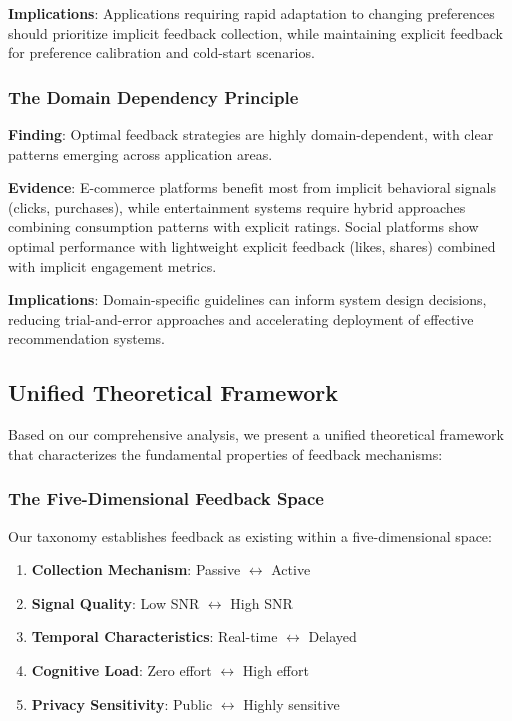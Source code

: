 \textbf{Implications}: Applications requiring rapid adaptation to changing preferences should prioritize implicit feedback collection, while maintaining explicit feedback for preference calibration and cold-start scenarios.

\subsubsection{The Domain Dependency Principle}
\textbf{Finding}: Optimal feedback strategies are highly domain-dependent, with clear patterns emerging across application areas.

\textbf{Evidence}: E-commerce platforms benefit most from implicit behavioral signals (clicks, purchases), while entertainment systems require hybrid approaches combining consumption patterns with explicit ratings. Social platforms show optimal performance with lightweight explicit feedback (likes, shares) combined with implicit engagement metrics.

\textbf{Implications}: Domain-specific guidelines can inform system design decisions, reducing trial-and-error approaches and accelerating deployment of effective recommendation systems.

\subsection{Unified Theoretical Framework}

Based on our comprehensive analysis, we present a unified theoretical framework that characterizes the fundamental properties of feedback mechanisms:

\subsubsection{The Five-Dimensional Feedback Space}
Our taxonomy establishes feedback as existing within a five-dimensional space:
\begin{enumerate}
    \item \textbf{Collection Mechanism}: Passive $\leftrightarrow$ Active
    \item \textbf{Signal Quality}: Low SNR $\leftrightarrow$ High SNR  
    \item \textbf{Temporal Characteristics}: Real-time $\leftrightarrow$ Delayed
    \item \textbf{Cognitive Load}: Zero effort $\leftrightarrow$ High effort
    \item \textbf{Privacy Sensitivity}: Public $\leftrightarrow$ Highly sensitive
\end{enumerate}

